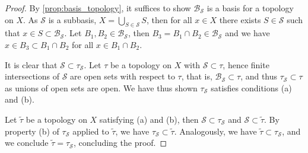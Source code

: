 \begin{proof}
    By \cref{prop:basis_topology}, it suffices to show \(\mathcal{B}_\mathcal{S}\) is a basis for a topology on \(X\). As \(\mathcal{S}\) is a subbasis, \(X = \bigcup_{S \in \mathcal{S}}{S}\), then for all \(x \in X\) there exists \(S \in \mathcal{S}\) such that \(x \in S \subset \mathcal{B}_{\mathcal{S}}\). Let \(B_1, B_2 \in \mathcal{B}_\mathcal{S}\), then \(B_3 = B_1 \cap B_2 \in \mathcal{B}_{\mathcal{S}}\) and we have \(x \in B_3 \subset B_1 \cap B_2\) for all \(x \in B_1 \cap B_2\). 

    It is clear that \(\mathcal{S} \subset \tau_{\mathcal{S}}\). Let \(\tau\) be a topology on \(X\) with \(\mathcal{S} \subset \tau\), hence finite intersections of \(\mathcal{S}\) are open sets with respect to \(\tau\), that is, \(\mathcal{B}_\mathcal{S} \subset \tau\), and thus \(\tau_{\mathcal{S}} \subset \tau\) as unions of open sets are open. We have thus shown \(\tau_\mathcal{S}\) satisfies conditions (a) and (b).

    Let \(\tilde{\tau}\) be a topology on \(X\) satisfying (a) and (b), then \(\mathcal{S} \subset \tau_{\mathcal{S}}\) and \(\mathcal{S} \subset \tilde{\tau}\). By property (b) of \(\tau_\mathcal{S}\) applied to \(\tilde{\tau}\), we have \(\tau_\mathcal{S} \subset \tilde{\tau}\). Analogously, we have \(\tilde{\tau} \subset \tau_\mathcal{S}\), and we conclude \(\tilde{\tau} = \tau_\mathcal{S}\), concluding the proof.
\end{proof}

